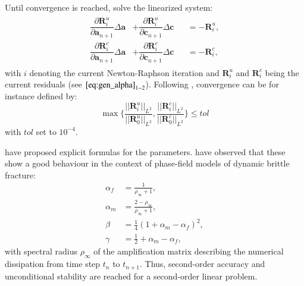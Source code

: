 Until convergence is reached, solve the linearized system:
\begin{equation} \label{eq:NewtonRaphson}
	\begin{aligned}
	\begin{alignedat}{2}
		\dfrac{\partial\mathbf{R}_{i}^{u}}{\partial\mathbf{a}_{n+1}}\Delta \mathbf{a} &+ \dfrac{\partial\mathbf{R}_{i}^{u}}{\partial\mathbf{c}_{n+1}}\Delta\mathbf{c} &&= -\mathbf{R}_{i}^{u}, \\
		\dfrac{\partial\mathbf{R}_{i}^{c}}{\partial\mathbf{a}_{n+1}}\Delta \mathbf{a} &+ \dfrac{\partial\mathbf{R}_{i}^{c}}{\partial\mathbf{c}_{n+1}}\Delta\mathbf{c} &&= -\mathbf{R}_{i}^{c},
	\end{alignedat}
	\end{aligned}
\end{equation}
with $i$ denoting the current Newton-Raphson iteration and $\mathbf{R}_{i}^{u}$ and $\mathbf{R}_{i}^{c}$ being the current residuals (see $\eqref{eq:gen_alpha}_{1-2}$). Following \citet{01_PF_dyn_brittle}, convergence can be for instance defined by:
\begin{equation} \label{eq:conv_cond}
	\max\{\frac{||\mathbf{R}_{i}^{u}||_{L^{2}}}{||\mathbf{R}_{0}^{u}||_{L^{2}}},\frac{||\mathbf{R}_{i}^{c}||_{L^{2}}}{||\mathbf{R}_{0}^{c}||_{L^{2}}}\}\leq tol
\end{equation}
with $tol$ set to $10^{-4}$.

\citet{10_PF_genAlpha} have proposed explicit formulas for the parameters. \citet{01_PF_dyn_brittle} have observed that these show a good behaviour in the context of phase-field models of dynamic brittle fracture:
\begin{equation}
	\begin{aligned}
		\alpha_{f} &= \frac{1}{\rho_{\infty}+1}, \\
		\alpha_{m} &= \frac{2-\rho_{\infty}}{\rho_{\infty}+1}, \\
		\beta &= \frac{1}{4}\left(1+\alpha_{m}-\alpha_{f}\right)^{2}, \\
		\gamma &= \frac{1}{2}+\alpha_{m}-\alpha_{f},
	\end{aligned}
\end{equation}
with spectral radius $\rho_{\infty}$ of the amplification matrix describing the numerical dissipation from time step $t_{n}$ to $t_{n+1}$. Thus, second-order accuracy and unconditional stability are reached for a second-order linear problem.
